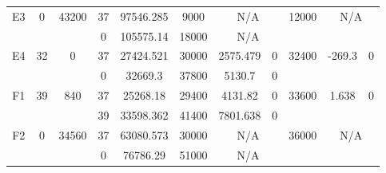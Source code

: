 \begin{sidewaystable}
\begin{tabular}{c||c|c||c|c|c|c|c||c|c|c}
         &
        
      \\
      \hline
      \multirow{2}{*}{E3} &
      \multirow{2}{*}{0} &
      \multirow{2}{*}{43200} &
      37 &
      97546.285 &
      9000 &
        \multicolumn{2}{|c||}{N/A} &
      \multirow{2}{*}{12000} &
        \multicolumn{2}{c}{\multirow{2}{*}{N/A}}
      \\
      \cline{4-8}
       &
       &
       &
      0 &
      105575.14 &
      18000 &
        \multicolumn{2}{|c||}{N/A} &
      
        
      \\
      \hline
      \multirow{2}{*}{E4} &
      \multirow{2}{*}{32} &
      \multirow{2}{*}{0} &
      37 &
      27424.521 &
      30000 &
        2575.479 &
        0 &
      \multirow{2}{*}{32400} &
        \multirow{2}{*}{-269.3} &
        \multirow{2}{*}{0}
      \\
      \cline{4-8}
       &
       &
       &
      0 &
      32669.3 &
      37800 &
        5130.7 &
        0 &
      
         &
        
      \\
      \hline
      \multirow{2}{*}{F1} &
      \multirow{2}{*}{39} &
      \multirow{2}{*}{840} &
      37 &
      25268.18 &
      29400 &
        4131.82 &
        0 &
      \multirow{2}{*}{33600} &
        \multirow{2}{*}{1.638} &
        \multirow{2}{*}{0}
      \\
      \cline{4-8}
       &
       &
       &
      39 &
      33598.362 &
      41400 &
        7801.638 &
        0 &
      
         &
        
      \\
      \hline
      \multirow{2}{*}{F2} &
      \multirow{2}{*}{0} &
      \multirow{2}{*}{34560} &
      37 &
      63080.573 &
      30000 &
        \multicolumn{2}{|c||}{N/A} &
      \multirow{2}{*}{36000} &
        \multicolumn{2}{c}{\multirow{2}{*}{N/A}}
      \\
      \cline{4-8}
       &
       &
       &
      0 &
      76786.29 &
      51000 &
        \multicolumn{2}{|c||}{N/A} &
      
        
      \\
\end{tabular}
\label{table:RDS2-9235.tex} 
\end{sidewaystable}